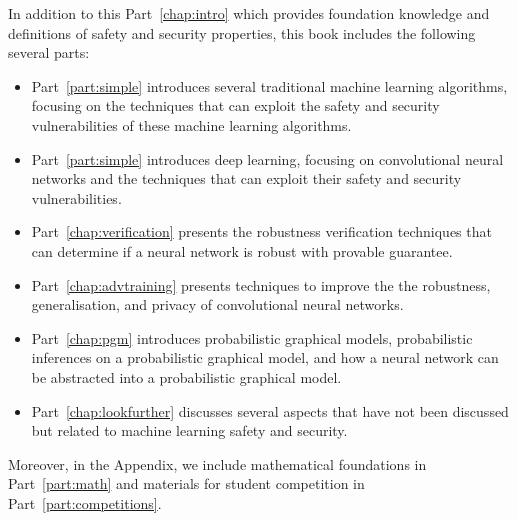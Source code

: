 \newpage 
{}




In addition to this Part~\ref{chap:intro} which provides foundation knowledge and definitions of safety and security properties, this book includes the following several parts: 

\begin{itemize}
    \item Part~\ref{part:simple} introduces several traditional machine learning algorithms, focusing on the techniques that can exploit the safety and security  vulnerabilities of these machine learning algorithms. 
    \item Part~\ref{part:simple} introduces deep learning, focusing on convolutional neural networks and the techniques that can exploit their safety and security vulnerabilities. 
    \item Part~\ref{chap:verification} presents the robustness verification techniques that can determine if a neural network is robust with provable guarantee. 
    \item Part~\ref{chap:advtraining} presents techniques to improve the the robustness, generalisation, and privacy of convolutional neural networks. 
    \item Part~\ref{chap:pgm} introduces probabilistic graphical models, probabilistic inferences on a probabilistic graphical model, and how a neural network can be abstracted into a probabilistic graphical model. 
    \item Part~\ref{chap:lookfurther} discusses several aspects that have not been discussed but related to machine learning safety and security. 
\end{itemize}
Moreover, in the Appendix, we include mathematical foundations in Part~\ref{part:math} and materials for student  competition in Part~\ref{part:competitions}. 
